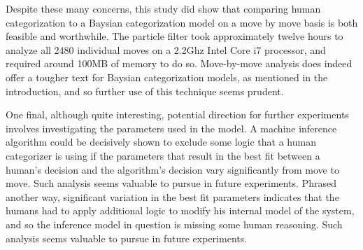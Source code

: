 Despite these many concerns, this study did show that comparing human
categorization to a Baysian categorization model on a move by move basis is both
feasible and worthwhile.  The particle filter took approximately twelve hours to
analyze all 2480 individual moves on a 2.2Ghz Intel Core i7 processor, and
required around 100MB of memory to do so. Move-by-move analysis does indeed
offer a tougher text for Baysian categorization models, as mentioned in the
introduction, and so further use of this technique seems prudent.

One final, although quite interesting, potential direction for further
experiments involves investigating the parameters used in the model. 
A machine inference algorithm could be decisively shown to exclude some logic that a human
categorizer is using if the parameters that result in the best fit between a
human's decision and the algorithm's decision vary significantly from move to move.
Such analysis seems valuable to pursue in future experiments. Phrased
another way, significant variation in the best fit parameters indicates that the
humans had to apply additional logic to modify his internal model of the
system, and so the inference model in question is missing some human reasoning.
Such analysis seems valuable to pursue in future experiments.